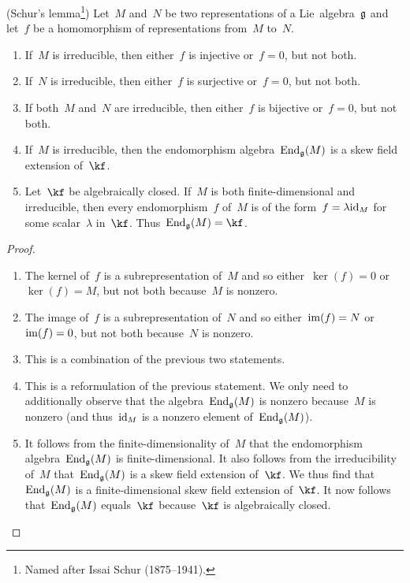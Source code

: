 \begin{proposition}(Schur’s lemma\footnote{Named after Issai Schur (1875--1941).})
	\label{schurs lemma}
	Let~$M$ and~$N$ be two representations of a Lie~algebra~$\mathfrak{g}$ and let~$f$ be a homomorphism of representations from~$M$ to~$N$.
	\begin{enumerate}
		\item
			If~$M$ is irreducible, then either~$f$ is injective or~$f = 0$, but not both.
		\item
			If~$N$ is irreducible, then either~$f$ is surjective or~$f = 0$, but not both.
		\item
			If both~$M$ and~$N$ are irreducible, then either~$f$ is bijective or~$f = 0$, but not both.
		\item
			If~$M$ is irreducible, then the endomorphism algebra~$\operatorname{End}_{\mathfrak{g}}(M)$ is a skew field extension of~$\kf$.
		\item
			\label{endomorphism algebra consists of scalars}
			Let~$\kf$ be algebraically closed.
			If~$M$ is both finite-dimensional and irreducible, then every endomorphism~$f$ of~$M$ is of the form~$f = \lambda \mathrm{id}_M$ for some scalar~$\lambda$ in~$\kf$.
			Thus~$\End_{\glie}(M) = \kf$.
	\end{enumerate}
\end{proposition}


\begin{proof}
	\leavevmode
	\begin{enumerate}
		\item
			The kernel of~$f$ is a subrepresentation of~$M$ and so either~$\ker(f) = 0$ or~$\ker(f) = M$, but not both because~$M$ is nonzero.
		\item
			The image of~$f$ is a subrepresentation of~$N$ and so either~$\operatorname{im}(f) = N$ or~$\operatorname{im}(f) = 0$, but not both because~$N$ is nonzero.
		\item
			This is a combination of the previous two statements.
		\item
			This is a reformulation of the previous statement.
			We only need to additionally observe that the algebra~$\operatorname{End}_{\mathfrak{g}}(M)$ is nonzero because~$M$ is nonzero (and thus~$\mathrm{id}_M$ is a nonzero element of~$\operatorname{End}_{\mathfrak{g}}(M)$).
		\item
			It follows from the finite-dimensionality of~$M$ that the endomorphism algebra~$\operatorname{End}_{\mathfrak{g}}(M)$ is finite-dimensional.
			It also follows from the irreducibility of~$M$ that~$\operatorname{End}_{\mathfrak{g}}(M)$ is a skew field extension of~$\kf$.
			We thus find that~$\operatorname{End}_{\mathfrak{g}}(M)$ is a finite-dimensional skew field extension of~$\kf$.
			It now follows that~$\operatorname{End}_{\mathfrak{g}}(M)$ equals~$\kf$ because~$\kf$ is algebraically closed.
		\qedhere
	\end{enumerate}
\end{proof}


